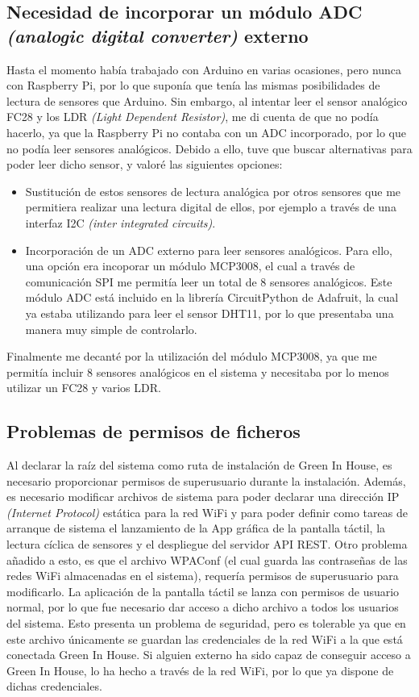     \subsection{Necesidad de incorporar un módulo ADC \textit{(analogic digital converter)} externo}
    Hasta el momento había trabajado con Arduino en varias ocasiones, pero nunca con Raspberry Pi, por lo que suponía que tenía las mismas posibilidades de lectura de sensores que Arduino. Sin embargo, al intentar leer el sensor analógico FC28 y los LDR \textit{(Light Dependent Resistor)}, me di cuenta de que no podía hacerlo, ya que la Raspberry Pi no contaba con un ADC incorporado, por lo que no podía leer sensores analógicos. Debido a ello, tuve que buscar alternativas para poder leer dicho sensor, y valoré las siguientes opciones:
    \begin{itemize}
        \item Sustitución de estos sensores de lectura analógica por otros sensores que me permitiera realizar una lectura digital de ellos, por ejemplo a través de una interfaz I2C \textit{(inter integrated circuits)}.
        \item Incorporación de un ADC externo para leer sensores analógicos. Para ello, una opción era incoporar un módulo MCP3008, el cual a través de comunicación SPI me permitía leer un total de 8 sensores analógicos. Este módulo ADC está incluido en la librería CircuitPython de Adafruit, la cual ya estaba utilizando para leer el sensor DHT11, por lo que presentaba una manera muy simple de controlarlo.
    \end{itemize}
    Finalmente me decanté por la utilización del módulo MCP3008, ya que me permitía incluir 8 sensores analógicos en el sistema y necesitaba por lo menos utilizar un FC28 y varios LDR.
    
    \subsection{Problemas de permisos de ficheros}
    Al declarar la raíz del sistema como ruta de instalación de Green In House, es necesario proporcionar permisos de superusuario durante la instalación. Además, es necesario modificar archivos de sistema para poder declarar una dirección IP \textit{(Internet Protocol)} estática para la red WiFi y para poder definir como tareas de arranque de sistema el lanzamiento de la App gráfica de la pantalla táctil, la lectura cíclica de sensores y el despliegue del servidor API REST.
    Otro problema añadido a esto, es que el archivo WPAConf (el cual guarda las contraseñas de las redes WiFi almacenadas en el sistema), requería permisos de superusuario para modificarlo. La aplicación de la pantalla táctil se lanza con permisos de usuario normal, por lo que fue necesario dar acceso a dicho archivo a todos los usuarios del sistema. Esto presenta un problema de seguridad, pero es tolerable ya que en este archivo únicamente se guardan las credenciales de la red WiFi a la que está conectada Green In House. Si alguien externo ha sido capaz de conseguir acceso a Green In House, lo ha hecho a través de la red WiFi, por lo que ya dispone de dichas credenciales.

